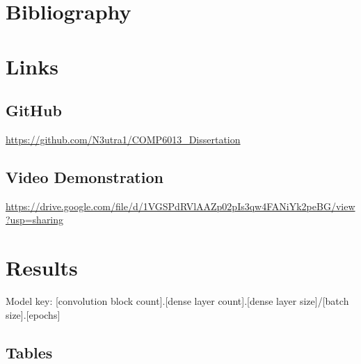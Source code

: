 \documentclass[12pt]{article}
\begin{document}
\pagebreak
\section{Bibliography}


\pagebreak

\appendix

\section{Links}

\subsection{GitHub}

\url{https://github.com/N3utra1/COMP6013_Dissertation}

\subsection{Video Demonstration}

\url{https://drive.google.com/file/d/1VGSPdRVlAAZp02pIs3qw4FANiYk2peBG/view?usp=sharing}


\section{Results}\label{appendix-results}


Model key: [convolution block count].[dense layer count].[dense layer size]/[batch size].[epochs]


\subsection{Tables}
\end{document}
